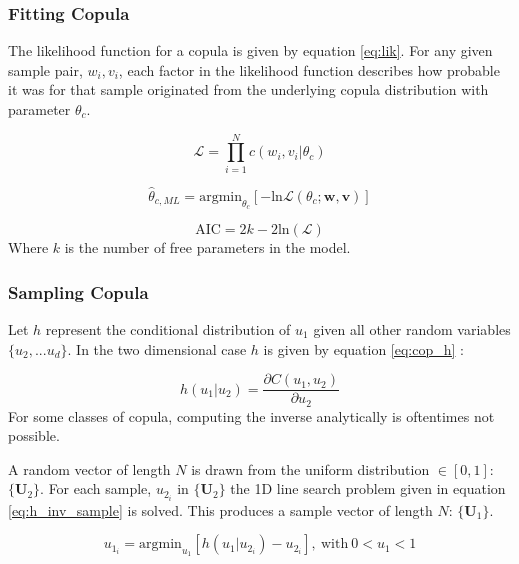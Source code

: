 \documentclass[t, pdftex]{beamer}
\begin{document}
\begin{frame}
\frametitle{Fitting Copula}
The likelihood function for a copula is given by equation \ref{eq:lik}.  For any given sample pair, $w_i, v_i$, each factor in the likelihood function describes how probable it was for that sample originated from the underlying copula distribution with parameter $\theta_c$.

\begin{equation}
\mathcal{L}= \prod_{i=1}^N c(w_i, v_i|\theta_c)
\label{eq:lik}
\end{equation}

\begin{equation}
\hat \theta_{c,ML} = \mathrm{argmin}_{\theta_c}[-\mathrm{ln}\mathcal{L}(\theta_{c} ; \mathbf w, \mathbf v)]
\label{eq:nlog_lik}
\end{equation}


\begin{equation}
\mathrm{AIC} = 2k - 2\mathrm{ln}(\mathcal{L})
\label{eq:cop_aic}
\end{equation}
Where $k$ is the number of free parameters in the model. 

\end{frame}

\begin{frame}
\frametitle{Sampling Copula}
Let $h$ represent the conditional distribution of $u_1$ given all other random variables $\{u_2, ... u_d\}$.  In the two dimensional case $h$ is given by equation \ref{eq:cop_h} \cite{Nelsen2006}:

\begin{equation}
h(u_1 | u_2) = \frac{\partial C(u_1, u_2)}{\partial u_2}
\label{eq:cop_h}
\end{equation}
For some classes of copula, computing the inverse analytically is oftentimes not possible.

A random vector of length $N$ is drawn from the uniform distribution $\in [0, 1]$:  $\{\mathbf U_2\}$.  For each sample, $u_{2_i}$ in $\{\mathbf U_2\}$ the 1D line search problem given in equation \ref{eq:h_inv_sample} is solved.  This produces a sample vector of length $N$: $\{\mathbf U_1\}$.

\begin{equation}
u_{1_i} = \mathrm{argmin}_{u_1} \left[ h(u_1|u_{2_i}) - u_{2_i} \right],\ \mathrm{with}\ 0 < u_1 < 1
\label{eq:h_inv_sample}
\end{equation}
\end{frame}
\end{document}
